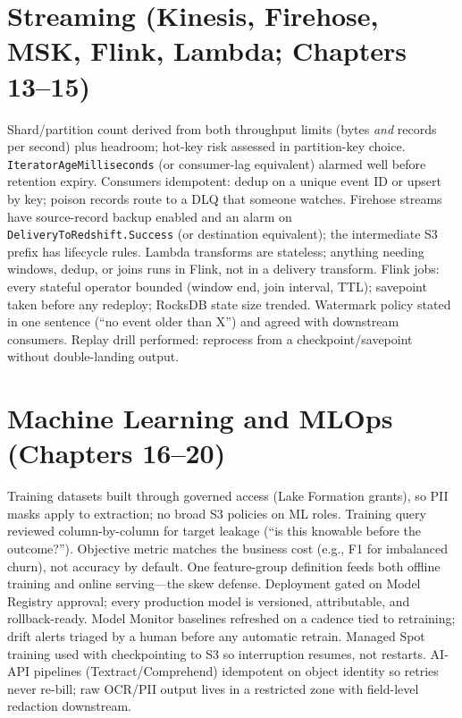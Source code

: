 \section{Streaming (Kinesis, Firehose, MSK, Flink, Lambda; Chapters 13--15)}
%
\begin{itemize}
\chk Shard/partition count derived from both throughput limits (bytes \emph{and} records per
second) plus headroom; hot-key risk assessed in partition-key choice.
\chk \texttt{IteratorAgeMilliseconds} (or consumer-lag equivalent) alarmed well before retention
expiry.
\chk Consumers idempotent: dedup on a unique event ID or upsert by key; poison records route to a
DLQ that someone watches.
\chk Firehose streams have source-record backup enabled and an alarm on
\texttt{DeliveryToRedshift.Success} (or destination equivalent); the intermediate S3 prefix has
lifecycle rules.
\chk Lambda transforms are stateless; anything needing windows, dedup, or joins runs in Flink,
not in a delivery transform.
\chk Flink jobs: every stateful operator bounded (window end, join interval, TTL); savepoint taken
before any redeploy; RocksDB state size trended.
\chk Watermark policy stated in one sentence (``no event older than X'') and agreed with
downstream consumers.
\chk Replay drill performed: reprocess from a checkpoint/savepoint without double-landing output.
\end{itemize}

\section{Machine Learning and MLOps (Chapters 16--20)}
%
\begin{itemize}
\chk Training datasets built through governed access (Lake Formation grants), so PII masks apply
to extraction; no broad S3 policies on ML roles.
\chk Training query reviewed column-by-column for target leakage (``is this knowable before the
outcome?'').
\chk Objective metric matches the business cost (e.g., F1 for imbalanced churn), not accuracy by
default.
\chk One feature-group definition feeds both offline training and online serving---the skew
defense.
\chk Deployment gated on Model Registry approval; every production model is versioned, attributable,
and rollback-ready.
\chk Model Monitor baselines refreshed on a cadence tied to retraining; drift alerts triaged by a
human before any automatic retrain.
\chk Managed Spot training used with checkpointing to S3 so interruption resumes, not restarts.
\chk AI-API pipelines (Textract/Comprehend) idempotent on object identity so retries never
re-bill; raw OCR/PII output lives in a restricted zone with field-level redaction downstream.
\end{itemize}


